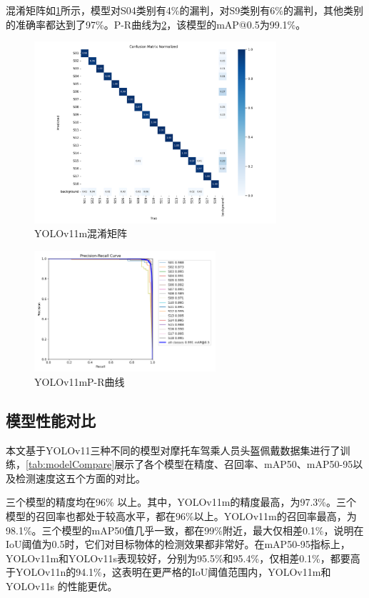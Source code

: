 混淆矩阵如\ref{fig:mmatrix}所示，模型对S04类别有4\%的漏判，对S9类别有6\%的漏判，其他类别的准确率都达到了97\%。P-R曲线为\ref{fig:mpr}，该模型的mAP@0.5为99.1\%。

\begin{figure}[H]
    \centering
    \includegraphics[width=0.8\textwidth]{figs/chap04/m_confusion_matrix_normalized.png}
    \caption{YOLOv11m混淆矩阵}
    \label{fig:mmatrix}
\end{figure}

\begin{figure}[H]
    \centering
    \includegraphics[width=0.6\textwidth]{figs/chap04/m_PR_curve.png}
    \caption{YOLOv11mP-R曲线}
    \label{fig:mpr}
\end{figure}

\subsection{模型性能对比}
本文基于YOLOv11三种不同的模型对摩托车驾乘人员头盔佩戴数据集进行了训练，\ref{tab:modelCompare}展示了各个模型在精度、召回率、mAP50、mAP50-95以及检测速度这五个方面的对比。

三个模型的精度均在96\% 以上。其中，YOLOv11m的精度最高，为97.3\%。三个模型的召回率也都处于较高水平，都在96\%以上。YOLOv11m的召回率最高，为98.1\%。三个模型的mAP50值几乎一致，都在99\%附近，最大仅相差0.1\%，说明在IoU阈值为0.5时，它们对目标物体的检测效果都非常好。在mAP50-95指标上，YOLOv11m和YOLOv11s表现较好，分别为95.5\%和95.4\%，仅相差0.1\%，都要高于YOLOv11n的94.1\%，这表明在更严格的IoU阈值范围内，YOLOv11m和YOLOv11s 的性能更优。

